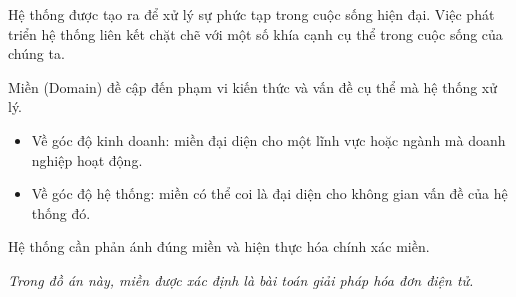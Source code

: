 Hệ thống được tạo ra để xử lý sự phức tạp trong cuộc sống hiện đại. Việc phát triển hệ thống liên kết chặt chẽ với một số khía cạnh cụ thể trong cuộc sống của chúng ta.

Miền (Domain) đề cập đến phạm vi kiến thức và vấn đề cụ thể mà hệ thống xử lý.





 
\begin{itemize}
\item Về góc độ kinh doanh: miền đại diện cho một lĩnh vực hoặc ngành mà doanh nghiệp hoạt động.
\item    Về góc độ hệ thống: miền có thể coi là đại diện cho không gian vấn đề của hệ thống đó.
\end{itemize}
 








Hệ thống cần phản ánh đúng miền và hiện thực hóa chính xác miền.


 
\textit{Trong đồ án này, miền được xác định là bài toán giải pháp hóa đơn điện tử.  }  

